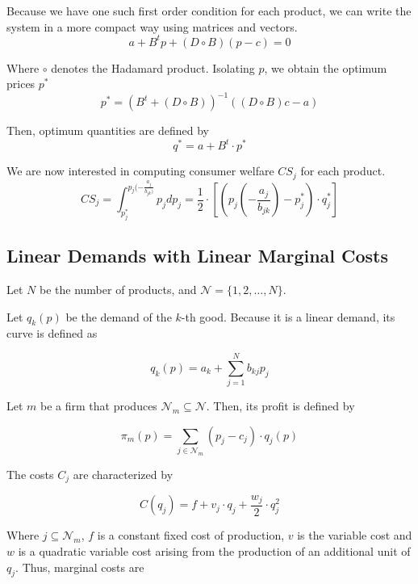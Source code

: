 \documentclass[12pt]{article}
\begin{document}
Because we have one such first order condition for each product, we can write the system in a more compact way using matrices and vectors.
\begin{equation*}
a + B^t p + (D \circ B)(p - c) = 0
\end{equation*}

Where $\circ$ denotes the Hadamard product.
Isolating $p$, we obtain the optimum prices $p^*$
\begin{equation*}
p^* = (B^t + (D \circ B))^{-1}((D \circ B) c - a)
\end{equation*}

Then, optimum quantities are defined by
\begin{equation*}
q^* = a + B^t \cdot p^*
\end{equation*}

We are now interested in computing consumer welfare $CS_j$ for each product. 
\begin{equation*}
CS_j = \int_{p_j^*}^{p_j(-\frac{a_j}{b_{jk})}} p_j d p_j = \frac{1}{2} \cdot [(p_j(-\frac{a_j}{b_{jk}}) - p_j^*) \cdot q_j^*]
\end{equation*}

\subsection{Linear Demands with Linear Marginal Costs}

Let $N$ be the number of products, and $\mathcal{N} = \{1, 2, \dots, N\}$.

Let $q_k (p)$ be the demand of the $k$-th good. Because it is a linear demand, its curve is defined as

\begin{equation*}
q_k(p) = a_k + \sum_{j=1}^N b_{kj}p_j
\end{equation*}

Let $m$ be a firm that produces $\mathcal{N}_m \subseteq \mathcal{N}$. Then, its profit is defined by

\begin{equation*}
\pi_m(p) = \sum_{j \in \mathcal{N}_m} (p_j - c_j)\cdot q_j(p)
\end{equation*}

The costs $C_j$ are characterized by

\begin{equation*}
C(q_j) = f + v_j \cdot q_j + \frac{w_j}{2} \cdot q_j ^ {2}
\end{equation*}

Where $j \subseteq \mathcal{N}_m$, $f$ is a constant fixed cost of production, $v$ is the variable cost and $w$ is a quadratic variable cost arising from the production of an additional unit of $q_j$. Thus, marginal costs are
\end{document}
